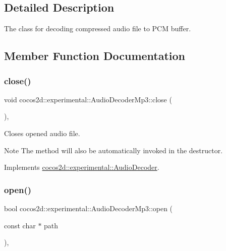\subsection{Detailed Description}
The class for decoding compressed audio file to P\+CM buffer. 

\subsection{Member Function Documentation}
\mbox{\label{classcocos2d_1_1experimental_1_1AudioDecoderMp3_a547b08590805b5f5443e8ba485e271b2}} 
\subsubsection{\texorpdfstring{close()}{close()}}
{\footnotesize\ttfamily void cocos2d\+::experimental\+::\+Audio\+Decoder\+Mp3\+::close (\begin{DoxyParamCaption}{ }\end{DoxyParamCaption})\hspace{0.3cm}{\ttfamily [override]}, {\ttfamily [virtual]}}



Closes opened audio file. 

\begin{DoxyNote}{Note}
The method will also be automatically invoked in the destructor. 
\end{DoxyNote}


Implements \hyperlink{classcocos2d_1_1experimental_1_1AudioDecoder_a89e94516cd7103d98475dc27462a58a7}{cocos2d\+::experimental\+::\+Audio\+Decoder}.

\mbox{\label{classcocos2d_1_1experimental_1_1AudioDecoderMp3_adb47b02e2c9774cb069f393c5a63608a}} 
\subsubsection{\texorpdfstring{open()}{open()}}
{\footnotesize\ttfamily bool cocos2d\+::experimental\+::\+Audio\+Decoder\+Mp3\+::open (\begin{DoxyParamCaption}\item[{const char $\ast$}]{path }\end{DoxyParamCaption})\hspace{0.3cm}{\ttfamily [override]}, {\ttfamily [virtual]}}



